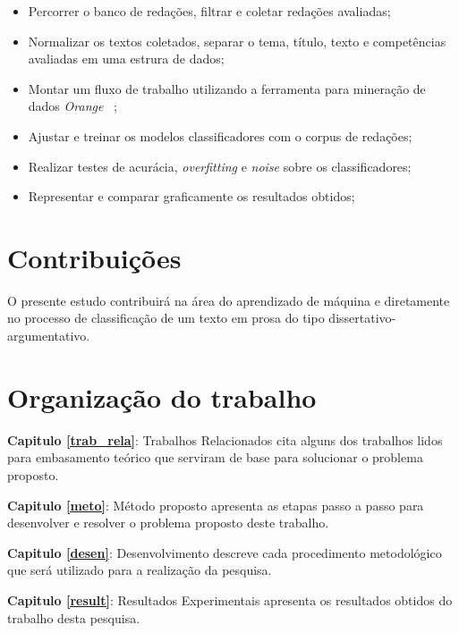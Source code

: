 \begin{itemize}
 \item Percorrer o banco de redações, filtrar e coletar redações avaliadas;
 \item Normalizar os textos coletados, separar o tema, título, texto e competências avaliadas em uma estrura de dados;
 \item Montar um fluxo de trabalho utilizando a ferramenta para mineração de dados \textit{Orange} ~\cite{JMLR:demsar13a};
 \item Ajustar e treinar os modelos classificadores com o corpus de redações; 
 \item Realizar testes de acurácia, \textit{overfitting} e \textit{noise} sobre os classificadores;
 \item Representar e comparar graficamente os resultados obtidos;
\end{itemize}

\section{Contribuições}

O presente estudo contribuirá na área do aprendizado de máquina e diretamente no processo de classificação de um texto em prosa do tipo dissertativo-argumentativo.

\section{Organização do trabalho}

\noindent \textbf{Capitulo \ref{trab_rela}}: Trabalhos Relacionados cita alguns dos trabalhos lidos para  embasamento teórico que serviram de base para solucionar o problema proposto.

\noindent \textbf{Capitulo \ref{meto}}: Método proposto apresenta as etapas passo a passo para desenvolver e resolver o problema proposto deste trabalho.

\noindent \textbf{Capitulo \ref{desen}}: Desenvolvimento descreve cada procedimento metodológico que será
utilizado para a realização da pesquisa.

\noindent \textbf{Capitulo \ref{result}}: Resultados Experimentais apresenta os resultados obtidos do trabalho desta pesquisa.